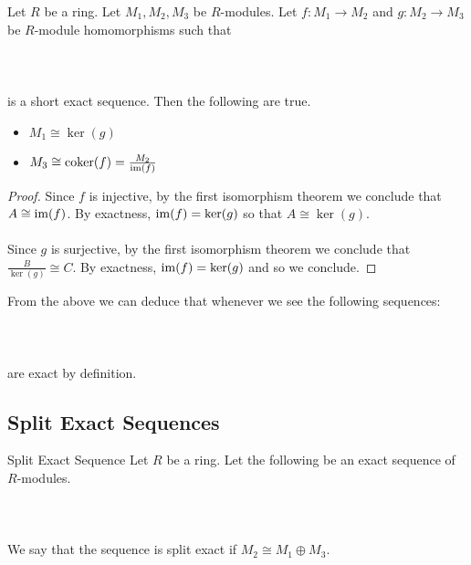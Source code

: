 \documentclass[a4paper]{article}
\begin{document}
\begin{lmm}{}{} Let $R$ be a ring. Let $M_1,M_2,M_3$ be $R$-modules. Let $f:M_1\to M_2$ and $g:M_2\to M_3$ be $R$-module homomorphisms such that \\~\\
\\~\\
is a short exact sequence. Then the following are true. 
\begin{itemize}
\item $M_1\cong\ker(g)$
\item $M_3\cong\text{coker}(f)=\frac{M_2}{\operatorname{im}(f)}$
\end{itemize} \tcbline
\begin{proof}
Since $f$ is injective, by the first isomorphism theorem we conclude that $A\cong\operatorname{im}(f)$. By exactness, $\operatorname{im}(f)=\ker(g)$ so that $A\cong\ker(g)$. \\~\\

Since $g$ is surjective, by the first isomorphism theorem we conclude that $\frac{B}{\ker(g)}\cong C$. By exactness, $\operatorname{im}(f)=\ker(g)$ and so we conclude. 
\end{proof}
\end{lmm}

From the above we can deduce that whenever we see the following sequences: \\~\\
\\~\\
are exact by definition. 

\subsection{Split Exact Sequences}
\begin{defn}{Split Exact Sequence}{} Let $R$ be a ring. Let the following be an exact sequence of $R$-modules. \\~\\
\\~\\
We say that the sequence is split exact if $M_2\cong M_1\oplus M_3$. 
\end{defn}
\end{document}
